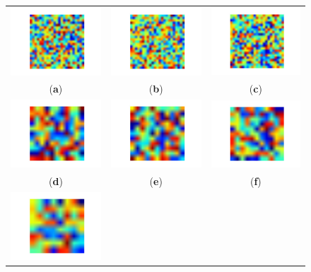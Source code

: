 \begin{figure}[h]
    \centering
    \begin{tabular}{ccc}
        \includegraphics[width=0.2\columnwidth]{images/05-modeling/autoencoder_levels/autoencoders_2_0} &
        \includegraphics[width=0.2\columnwidth]{images/05-modeling/autoencoder_levels/autoencoders_2_1} &
        \includegraphics[width=0.2\columnwidth]{images/05-modeling/autoencoder_levels/autoencoders_2_2} \\
        (\textbf{a}) & (\textbf{b}) & (\textbf{c}) \\
        \includegraphics[width=0.2\columnwidth]{images/05-modeling/autoencoder_levels/autoencoders_4_0} &
        \includegraphics[width=0.2\columnwidth]{images/05-modeling/autoencoder_levels/autoencoders_4_1} &
        \includegraphics[width=0.2\columnwidth]{images/05-modeling/autoencoder_levels/autoencoders_4_2} \\
        (\textbf{d}) & (\textbf{e}) & (\textbf{f}) \\
        \includegraphics[width=0.2\columnwidth]{images/05-modeling/autoencoder_levels/autoencoders_7_0} &

\end{tabular}
\end{figure}
